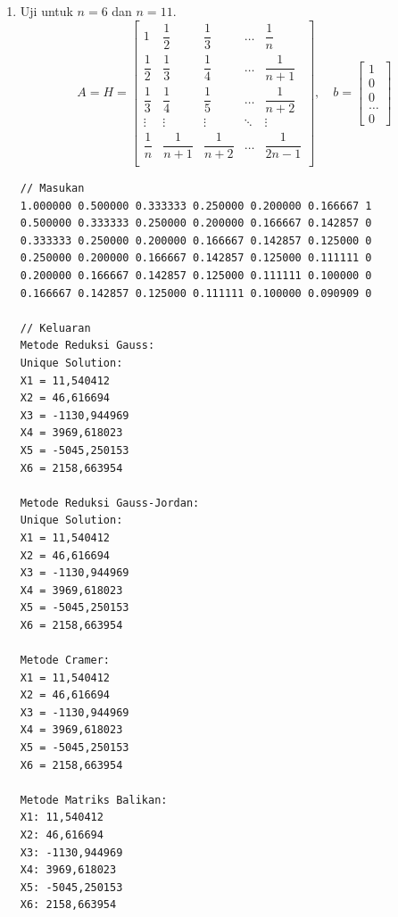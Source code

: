 \begin{enumerate}[label=(\alph*)]
\pagebreak
\item Uji untuk $n = 6$ dan $n = 11$.
\[ A = H = \begin{bmatrix}
    1               & \dfrac{1}{2}   & \dfrac{1}{3}   & \ldots & \dfrac{1}{n}     \\[1em]
    \dfrac{1}{2}    & \dfrac{1}{3}   & \dfrac{1}{4}   & \ldots & \dfrac{1}{n+1}   \\[1em]
    \dfrac{1}{3}    & \dfrac{1}{4}   & \dfrac{1}{5}   & \ldots & \dfrac{1}{n+2}   \\[1em]
    \vdots          & \vdots         & \vdots         & \ddots & \vdots           \\[1em]
    \dfrac{1}{n}    & \dfrac{1}{n+1} & \dfrac{1}{n+2} & \ldots & \dfrac{1}{2n-1}\\
\end{bmatrix}, \quad b =
\begin{bmatrix}
    1 \\ 0 \\ 0 \\ \ldots \\ 0
\end{bmatrix}\]

\begin{lstlisting}[caption = spl-1d1.txt]
// Masukan
1.000000 0.500000 0.333333 0.250000 0.200000 0.166667 1
0.500000 0.333333 0.250000 0.200000 0.166667 0.142857 0
0.333333 0.250000 0.200000 0.166667 0.142857 0.125000 0
0.250000 0.200000 0.166667 0.142857 0.125000 0.111111 0
0.200000 0.166667 0.142857 0.125000 0.111111 0.100000 0
0.166667 0.142857 0.125000 0.111111 0.100000 0.090909 0

// Keluaran
Metode Reduksi Gauss:
Unique Solution:
X1 = 11,540412
X2 = 46,616694
X3 = -1130,944969
X4 = 3969,618023
X5 = -5045,250153
X6 = 2158,663954

Metode Reduksi Gauss-Jordan:
Unique Solution:
X1 = 11,540412
X2 = 46,616694
X3 = -1130,944969
X4 = 3969,618023
X5 = -5045,250153
X6 = 2158,663954

Metode Cramer:
X1 = 11,540412
X2 = 46,616694
X3 = -1130,944969
X4 = 3969,618023
X5 = -5045,250153
X6 = 2158,663954

Metode Matriks Balikan:
X1: 11,540412
X2: 46,616694
X3: -1130,944969
X4: 3969,618023
X5: -5045,250153
X6: 2158,663954\end{lstlisting}


\end{enumerate}
